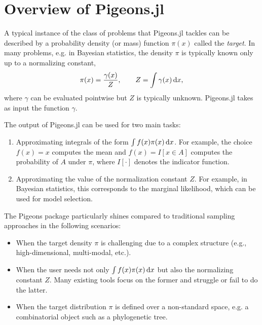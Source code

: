 \section{Overview of Pigeons.jl}
A typical instance of the class of problems that Pigeons.jl tackles can be described by
a probability density (or mass) function
$\pi(x)$ called the \emph{target}. In many problems, e.g. in Bayesian statistics, the 
density $\pi$ is typically known only up to a normalizing constant, 
\[
\label{eq:normalizing_constant}
  \pi(x) = \frac{\gamma(x)}{Z}, \qquad Z = \int \gamma(x) \, \dee x,
\]  
where $\gamma$ can be evaluated pointwise but $Z$ is typically unknown.
Pigeons.jl takes as input the function $\gamma$.

 
The output of Pigeons.jl can be used for two main tasks:
\begin{enumerate}
    \item Approximating integrals of the form $\int f(x) \pi(x) \, \mathrm{d} x$.  
    For example, the choice $f(x) = x$ computes the mean and 
    $f(x) = I[x \in A]$ computes the probability of $A$ under $\pi$,
    where $I[\cdot]$ denotes the indicator function.

    \item Approximating the value of the normalization constant $Z$. For 
    example, in Bayesian statistics, this corresponds to the 
    marginal likelihood, which can be used for model selection. 
\end{enumerate}
The Pigeons package particularly shines compared to traditional sampling approaches in the 
following scenarios:
\begin{itemize}
    \item When the target density $\pi$ is challenging due to a complex structure 
    (e.g., high-dimensional, multi-modal, etc.).
    
    \item When the user needs not only $\int f(x) \pi(x) \, \mathrm{d} x$ but also
    the normalizing constant $Z$. 
    Many existing tools focus on the former and struggle or fail to do the latter. 
    
    \item When the target distribution $\pi$ is defined over a non-standard space, 
    e.g. a combinatorial object such as a phylogenetic tree.  
\end{itemize}
